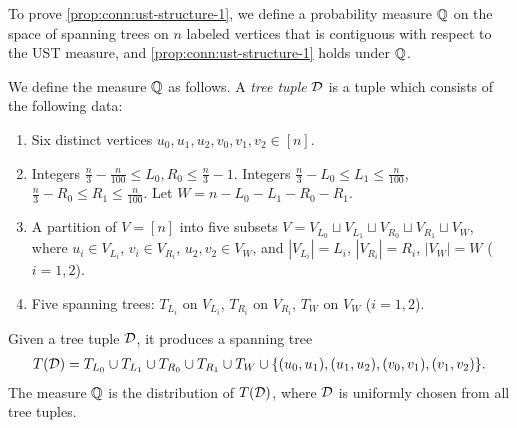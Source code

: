 To prove \cref{prop:conn:ust-structure-1}, we define a probability measure $\bQ$ on the space of spanning trees on $n$ labeled vertices that is contiguous with respect to the UST measure, and \cref{prop:conn:ust-structure-1} holds under $\bQ$.

\begin{definition}[Measure $\bQ$] \label{defn:conn:ust-measure-q}
  We define the measure $\bQ$ as follows.
  A \emph{tree tuple} $\mathcal{D}$ is a tuple which consists of the following data:
  \begin{enumerate}[label=(\roman*)]
    \item Six distinct vertices $u_0,u_1,u_2,v_0,v_1,v_2\in [n]$.
    \item Integers $\frac n3-\frac n{100}\le L_0,R_0 \le \frac n3-1$.
    Integers $\frac n3-L_0\le L_1 \le \frac{n}{100}$, $\frac n3-R_0\le R_1 \le \frac{n}{100}$.
    Let $W = n-L_0-L_1-R_0-R_1$.
    \item A partition of $V=[n]$ into five subsets $V=V_{L_0}\sqcup V_{L_1}\sqcup V_{R_0}\sqcup V_{R_1} \sqcup V_W$, where $u_i\in V_{L_i}$, $v_i\in V_{R_i}$, $u_2,v_2\in V_W$, and $|V_{L_i}|=L_i$, $|V_{R_i}|=R_i$, $|V_W|=W$ ($i=1,2$).
    \item Five spanning trees: $T_{L_i}$ on $V_{L_i}$, $T_{R_i}$ on $V_{R_i}$, $T_W$ on $V_W$ ($i=1,2$).
  \end{enumerate}
  Given a tree tuple $\mathcal{D}$, it produces a spanning tree
  \begin{align*}
    T(\mathcal{D}) = T_{L_0} \cup T_{L_1} \cup T_{R_0} \cup T_{R_1} \cup T_W \cup \{(u_0,u_1),(u_1,u_2),(v_0,v_1),(v_1,v_2)\}.
  \end{align*}
  The measure $\bQ$ is the distribution of $T(\mathcal{D})$, where $\mathcal{D}$ is uniformly chosen from all tree tuples.
\end{definition}

